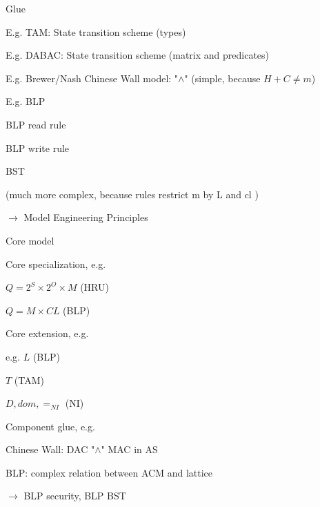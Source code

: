 \documentclass[a4paper]{article}
\begin{document}
\begin{multicols}{3}
    Glue
    \begin{itemize*}
        \item E.g. TAM: State transition scheme (types)
        \item E.g. DABAC: State transition scheme (matrix and predicates)
        \item E.g. Brewer/Nash Chinese Wall model: "$\wedge$" (simple, because $H+C\not= m$)
        \item E.g. BLP
        \begin{itemize*}
            \item BLP read rule
            \item BLP write rule
            \item BST
            \item (much more complex, because rules restrict m by L and cl )
        \end{itemize*}
    \end{itemize*}

    $\rightarrow$  Model Engineering Principles
    \begin{itemize*}
        \item  Core model
        \item  Core specialization, e.g.
        \begin{itemize*}
            \item $Q = 2^S\times 2^O \times M$ (HRU)
            \item $Q = M\times CL$ (BLP)
        \end{itemize*}
        \item Core extension, e.g.
        \begin{itemize*}
            \item e.g. $L$ (BLP)
            \item $T$ (TAM)
            \item $D, dom ,=_{NI}$ (NI)
        \end{itemize*}
        \item Component glue, e.g.
        \begin{itemize*}
            \item Chinese Wall: DAC "$\wedge$" MAC in AS
            \item BLP: complex relation between ACM and lattice
            \item $\rightarrow$  BLP security, BLP BST
        \end{itemize*}
    \end{itemize*}


\end{multicols}
\end{document}
